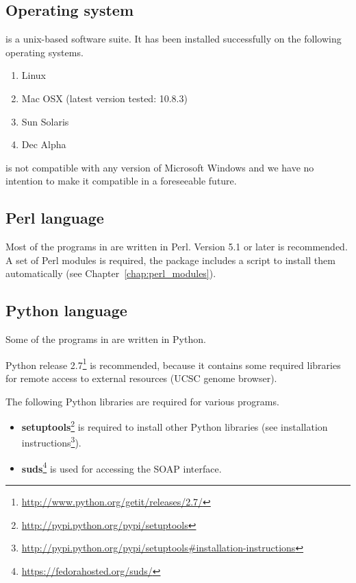 \documentclass[12pt,a4paper, oneside]{scrreprt} %
\begin{document}
\subsection{Operating system}

\RSAT is a unix-based software suite. It has been installed
successfully on the following operating systems.

\begin{enumerate}
\item Linux

\item Mac OSX (latest version tested: 10.8.3)

\item Sun Solaris

\item Dec Alpha

\end{enumerate}

\RSAT is not compatible with any version of Microsoft Windows and we
have no intention to make it compatible in a foreseeable future.

\subsection{Perl language}

Most of the programs in \RSAT are written in Perl. Version 5.1 or
later is recommended. A set of Perl modules is required, the \RSAT
package includes a script to install them automatically (see
Chapter~\ref{chap:perl_modules}).

\subsection{Python language}

Some of the programs in \RSAT are written in Python. 

Python release
2.7\footnote{\url{http://www.python.org/getit/releases/2.7/}} is
recommended, because it contains some required libraries for remote
access to external resources (UCSC genome browser).

The following Python libraries are required for various programs.

\begin{itemize}
\item
  \textbf{setuptools}\footnote{\url{http://pypi.python.org/pypi/setuptools}}
  is required to install other Python libraries (see installation
  instructions\footnote{\url{http://pypi.python.org/pypi/setuptools\#installation-instructions}}).

\item \textbf{suds}\footnote{\url{https://fedorahosted.org/suds/}} is
  used for accessing the SOAP interface.

\end{itemize}
\end{document}
